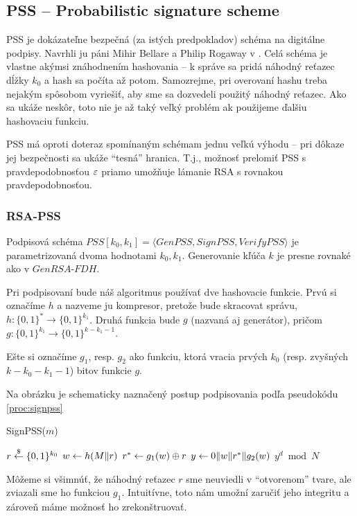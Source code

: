\subsection{PSS -- Probabilistic signature scheme}

PSS je dokázateľne bezpečná (za istých predpokladov) schéma na
digitálne podpisy. Navrhli ju páni Mihir Bellare a Philip Rogaway
v \cite{pss}. Celá schéma je vlastne akýmsi znáhodnením hashovania -- k
správe sa pridá náhodný reťazec dĺžky $k_0$ a hash sa počíta až
potom. Samozrejme, pri overovaní hashu treba nejakým spôsobom
vyriešiť, aby sme sa dozvedeli použitý náhodný reťazec. Ako sa ukáže
neskôr, toto nie je až taký veľký problém ak použijeme ďalšiu
hashovaciu funkciu.

PSS má oproti doteraz spomínaným schémam jednu veľkú výhodu -- pri
dôkaze jej bezpečnosti sa ukáže ``tesná'' hranica. T.j., možnosť
prelomiť PSS s pravdepodobnosťou $\varepsilon$ priamo umožňuje lámanie RSA s
rovnakou pravdepodobnosťou.


\subsubsection{RSA-PSS}

Podpisová schéma $PSS[k_0,k_1]=\langle GenPSS,SignPSS,VerifyPSS\rangle$ je
parametrizovaná dvoma hodnotami $k_0, k_1$.
Generovanie kľúča $k$ je presne rovnaké ako v $GenRSA\mbox{-}FDH$.

Pri podpisovaní bude náš algoritmus používať dve hashovacie funkcie.
Prvú si označíme $h$ a nazveme ju kompresor, pretože bude skracovat
správu, $h:\{0,1\}^* \rightarrow \{0,1\}^{k_1}$.
Druhá funkcia bude $g$ (nazvaná aj generátor), pričom
$g:\{0,1\}^{k_1} \rightarrow \{0,1\}^{k-k_1-1}$.

Ešte si označíme $g_1$, resp. $g_2$ ako funkciu, ktorá vracia
prvých $k_0$ (resp. zvyšných $k-k_0-k_1-1$) bitov funkcie $g$.

Na obrázku \todo{} je schematicky naznačený postup podpisovania
podľa pseudokódu \ref{proc:signpss}

\begin{procedure}
    \caption{SignPSS($m$)}
    \label{proc:signpss}
    $r \overset{\$}{\leftarrow} \{0,1\}^{k_0}$\;
    $w \leftarrow h(M \| r)$\;
    $r^* \leftarrow g_1(w) \oplus r$\;
    $y \leftarrow 0 \| w \| r^* \| g_2(w)$\;
    \Return $y^d \bmod N$\;
\end{procedure}

Môžeme si všimnúť, že náhodný reťazec $r$ sme neuviedli v
``otvorenom'' tvare, ale zviazali sme ho funkciou $g_1$. Intuitívne,
toto nám umožní zaručiť jeho integritu a zároveň máme možnosť ho
zrekonštruovať.

